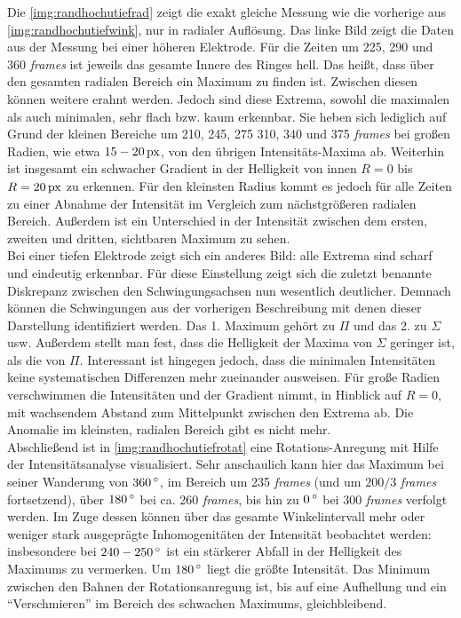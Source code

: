 \documentclass[numbers=noenddot,a4paper]{scrartcl}
\newcommand{\degree}{^\circ}
\newcommand{\tilt}[1]{\textit{#1}}
\begin{document}
			Die \ref{img:randhochutiefrad} zeigt die exakt gleiche Messung wie die vorherige aus \ref{img:randhochutiefwink}, nur in radialer Auflösung. Das linke Bild zeigt die Daten aus der Messung bei einer höheren Elektrode. Für die Zeiten um 225, 290 und 360 \tilt{frames} ist jeweils das gesamte Innere des Ringes hell. Das heißt, dass über den gesamten radialen Bereich ein Maximum zu finden ist. Zwischen diesen können weitere erahnt werden. Jedoch sind diese Extrema, sowohl die maximalen als auch minimalen, sehr flach bzw. kaum erkennbar. Sie heben sich lediglich auf Grund der kleinen Bereiche um 210, 245, 275 310, 340 und 375 \tilt{frames} bei großen Radien, wie etwa $\unit[15-20]{px}$, von den übrigen Intensitäts-Maxima ab. Weiterhin ist insgesamt ein schwacher Gradient in der Helligkeit von innen $R=0$ bis $R=\unit[20]{px}$ zu erkennen. Für den kleinsten Radius kommt es jedoch für alle Zeiten zu einer Abnahme der Intensität im Vergleich zum nächstgrößeren radialen Bereich. Außerdem ist ein Unterschied in der Intensität zwischen dem ersten, zweiten und dritten, sichtbaren Maximum zu sehen.\\
			Bei einer tiefen Elektrode zeigt sich ein anderes Bild: alle Extrema sind scharf und eindeutig erkennbar. Für diese Einstellung zeigt sich die zuletzt benannte Diskrepanz zwischen den Schwingungsachsen nun wesentlich deutlicher. Demnach können die Schwingungen aus der vorherigen Beschreibung mit denen dieser Darstellung identifiziert werden. Das 1. Maximum gehört zu $\Pi$ und das 2. zu $\Sigma$ usw. Außerdem stellt man fest, dass die Helligkeit der Maxima von $\Sigma$ geringer ist, als die von $\Pi$. Interessant ist hingegen jedoch, dass die minimalen Intensitäten keine systematischen Differenzen mehr zueinander ausweisen. Für große Radien verschwimmen die Intensitäten und der Gradient nimmt, in Hinblick auf $R=0$, mit wachsendem Abstand zum Mittelpunkt zwischen den Extrema ab. Die Anomalie im kleinsten, radialen Bereich gibt es nicht mehr.\\
			Abschließend ist in \ref{img:randhochutiefrotat} eine Rotations-Anregung mit Hilfe der Intensitätsanalyse visualisiert. Sehr anschaulich kann hier das Maximum bei seiner Wanderung von $\unit[360]{\degree}$, im Bereich um 235 \tilt{frames} (und um $200/3$ \tilt{frames} fortsetzend), über $\unit[180]{\degree}$ bei ca. 260 \tilt{frames}, bis hin zu $\unit[0]{\degree}$ bei 300 \tilt{frames} verfolgt werden. Im Zuge dessen können über das gesamte Winkelintervall mehr oder weniger stark ausgeprägte Inhomogenitäten der Intensität beobachtet werden: insbesondere bei $\unit[240-250]{\degree}$ ist ein stärkerer Abfall in der Helligkeit des Maximums zu vermerken. Um $\unit[180]{\degree}$ liegt die größte Intensität. Das Minimum zwischen den Bahnen der Rotationsanregung ist, bis auf eine Aufhellung und ein "`Verschmieren"' im Bereich des schwachen Maximums, gleichbleibend. \\
\end{document}
